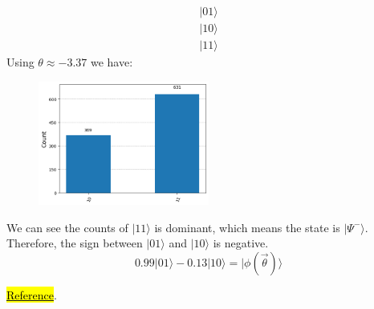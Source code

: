 \documentclass{article}
\begin{document}
\begin{itemize}
\begin{equation*}
\begin{array}{c}
                |01 \rangle\\
                |10 \rangle\\
                |11 \rangle
            \end{array}
          \end{equation*}
          Using \(\theta \approx -3.37\) we have:
	      \begin{figure}[H]
		      \centering
		      \includegraphics[width=0.5\textwidth, height=0.3\textheight]{BellHis.png}
	      \end{figure}
	      We can see the counts of \(|11\rangle\) is dominant, which means the state is \(|\Psi^-\rangle\). Therefore, the sign between \(|01\rangle\) and \(|10\rangle\) is negative.
	      \begin{equation}
		      0.99 |01\rangle - 0.13 |10\rangle = |\phi(\vec{\theta}) \rangle
	      \end{equation}

	      \href{https://grishmaprs.medium.com/measurement-based-quantum-computation-9de426f40856}{\hl{Reference}}.



\end{itemize}
\end{document}

